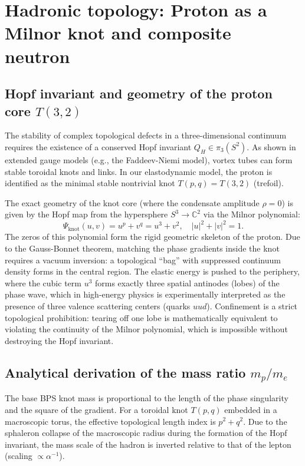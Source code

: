 \documentclass[11pt,a4paper]{article}
\begin{document}
\section{Hadronic topology: Proton as a Milnor knot and composite neutron}

\subsection{Hopf invariant and geometry of the proton core $T(3,2)$}
The stability of complex topological defects in a three-dimensional continuum requires the existence of a conserved Hopf invariant $Q_H \in \pi_3(S^2)$. As shown in extended gauge models (e.g., the Faddeev-Niemi model), vortex tubes can form stable toroidal knots and links.
In our elastodynamic model, the proton is identified as the minimal stable nontrivial knot $T(p,q) = T(3,2)$ (trefoil). 

The exact geometry of the knot core (where the condensate amplitude $\rho = 0$) is given by the Hopf map from the hypersphere $S^3 \to \mathbb{C}^2$ via the Milnor polynomial:
\begin{equation}
\Psi_{\text{knot}}(u, v) = u^p + v^q = u^3 + v^2, \quad |u|^2 + |v|^2 = 1.
\end{equation}
The zeros of this polynomial form the rigid geometric skeleton of the proton. Due to the Gauss-Bonnet theorem, matching the phase gradients inside the knot requires a vacuum inversion: a topological ``bag'' with suppressed continuum density forms in the central region. The elastic energy is pushed to the periphery, where the cubic term $u^3$ forms exactly three spatial antinodes (lobes) of the phase wave, which in high-energy physics is experimentally interpreted as the presence of three valence scattering centers (quarks $uud$). Confinement is a strict topological prohibition: tearing off one lobe is mathematically equivalent to violating the continuity of the Milnor polynomial, which is impossible without destroying the Hopf invariant.

\subsection{Analytical derivation of the mass ratio $m_p/m_e$}
The base BPS knot mass is proportional to the length of the phase singularity and the square of the gradient. For a toroidal knot $T(p,q)$ embedded in a macroscopic torus, the effective topological length index is $p^2 + q^2$. Due to the sphaleron collapse of the macroscopic radius during the formation of the Hopf invariant, the mass scale of the hadron is inverted relative to that of the lepton (scaling $\propto \alpha^{-1}$).
\end{document}
